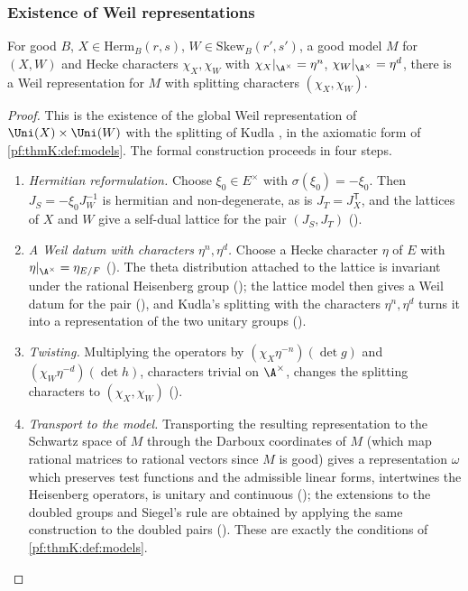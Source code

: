 \subsubsection{Existence of Weil representations}\label{sec:pf:thmK:weilex}

\begin{proposition}\label{pf:thmK:weilex}
For good $B$, $X\in\mathrm{Herm}_B(r,s)$, $W\in\mathrm{Skew}_B(r',s')$, a good model $M$ for $(X,W)$ and Hecke characters
$\chi_X,\chi_W$ with $\chi_X|_{\A^\times}=\eta^n$, $\chi_W|_{\A^\times}=\eta^d$, there is a Weil representation for $M$
with splitting characters $(\chi_X,\chi_W)$.
\end{proposition}

\begin{proof}
This is the existence of the global Weil representation of $\Uni(X)\times\Uni(W)$ \cite{Weil1964} with the splitting of
Kudla \cite{Kudla1994}, in the axiomatic form of \cref{pf:thmK:def:models}. The formal construction proceeds in four steps.
\begin{enumerate}[label=(\roman*)]
\item\emph{Hermitian reformulation.} Choose $\xi_0\in E^\times$ with $\sigma(\xi_0)=-\xi_0$. Then $J_S=-\xi_0J_W^{-1}$ is
hermitian and non-degenerate, as is $J_T=J_X^{\mathsf T}$, and the lattices of $X$ and $W$ give a self-dual lattice for the
pair $(J_S,J_T)$ ().
\item\emph{A Weil datum with characters $\eta^{n},\eta^{d}$.} Choose a Hecke character $\eta$ of $E$ with
$\eta|_{\A^\times}=\eta_{E/F}$ (). The theta distribution attached to the
lattice is invariant under the rational Heisenberg group ();
the lattice model then gives a Weil datum for the pair (), and Kudla's splitting
with the characters $\eta^n,\eta^d$ turns it into a representation of the two unitary groups
().
\item\emph{Twisting.} Multiplying the operators by $(\chi_X\eta^{-n})(\det g)$ and $(\chi_W\eta^{-d})(\det h)$, characters
trivial on $\A^\times$, changes the splitting characters to $(\chi_X,\chi_W)$
().
\item\emph{Transport to the model.} Transporting the resulting representation to the Schwartz space of $M$ through the
Darboux coordinates of $M$ (which map rational matrices to rational vectors since $M$ is good) gives a representation
$\omega$ which preserves test functions and the admissible linear forms, intertwines the Heisenberg operators, is unitary
and continuous (); the extensions to the doubled
groups and Siegel's rule are obtained by applying the same construction to the doubled pairs
(). These are exactly the conditions of \cref{pf:thmK:def:models}.
\end{enumerate}
\end{proof}



